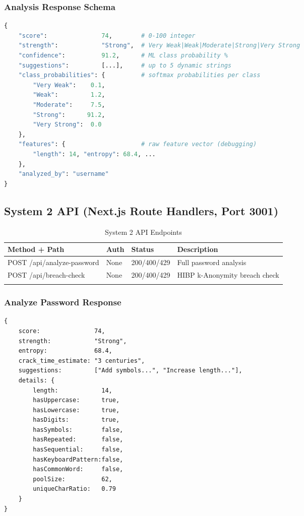 \documentclass[12pt,a4paper]{article}
\begin{document}
\subsubsection{Analysis Response Schema}

\begin{lstlisting}[language=Python, caption={System 1 API Response (JSON)}]
{
    "score":               74,        # 0-100 integer
    "strength":            "Strong",  # Very Weak|Weak|Moderate|Strong|Very Strong
    "confidence":          91.2,      # ML class probability %
    "suggestions":         [...],     # up to 5 dynamic strings
    "class_probabilities": {          # softmax probabilities per class
        "Very Weak":    0.1,
        "Weak":         1.2,
        "Moderate":     7.5,
        "Strong":      91.2,
        "Very Strong":  0.0
    },
    "features": {                     # raw feature vector (debugging)
        "length": 14, "entropy": 68.4, ...
    },
    "analyzed_by": "username"
}
\end{lstlisting}

\subsection{System 2 API (Next.js Route Handlers, Port 3001)}

\begin{longtable}{>{\ttfamily}lllp{4.5cm}}
\toprule
\textbf{Method + Path} & \textbf{Auth} & \textbf{Status} & \textbf{Description} \\
\midrule
\endhead

POST /api/analyze-password & None & 200/400/429 & Full password analysis \\
POST /api/breach-check     & None & 200/400/429 & HIBP k-Anonymity breach check \\

\bottomrule
\caption{System 2 API Endpoints}
\end{longtable}

\subsubsection{Analyze Password Response}

\begin{lstlisting}[style=tsstyle, caption={System 2 Full Analysis Response}]
{
    score:               74,
    strength:            "Strong",
    entropy:             68.4,
    crack_time_estimate: "3 centuries",
    suggestions:         ["Add symbols...", "Increase length..."],
    details: {
        length:            14,
        hasUppercase:      true,
        hasLowercase:      true,
        hasDigits:         true,
        hasSymbols:        false,
        hasRepeated:       false,
        hasSequential:     false,
        hasKeyboardPattern:false,
        hasCommonWord:     false,
        poolSize:          62,
        uniqueCharRatio:   0.79
    }
}
\end{lstlisting}
\end{document}
